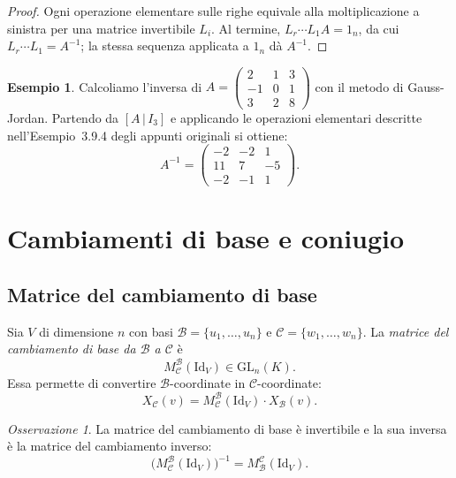 \documentclass[11pt, a4paper]{book}
\theoremstyle{definition}
\newtheorem{esempio}[definizione]{Esempio}
\theoremstyle{plain}
\theoremstyle{remark}
\newtheorem{osservazione}[definizione]{Osservazione}
\newcommand{\Id}{\mathrm{Id}}
\newcommand{\GL}{\mathrm{GL}}
\begin{document}
\begin{proof}
Ogni operazione elementare sulle righe equivale alla moltiplicazione a sinistra per una matrice invertibile $L_i$. Al termine, $L_r \cdots L_1 A = 1_n$, da cui $L_r \cdots L_1 = A^{-1}$; la stessa sequenza applicata a $1_n$ dà $A^{-1}$.
\end{proof}

\begin{exbox}
\begin{esempio}
Calcoliamo l'inversa di $A = \begin{pmatrix} 2 & 1 & 3 \\ -1 & 0 & 1 \\ 3 & 2 & 8 \end{pmatrix}$ con il metodo di Gauss-Jordan. Partendo da $[A\,|\,I_3]$ e applicando le operazioni elementari descritte nell'Esempio~3.9.4 degli appunti originali si ottiene:
\[
  A^{-1} = \begin{pmatrix} -2 & -2 & 1 \\ 11 & 7 & -5 \\ -2 & -1 & 1 \end{pmatrix}.
\]
\end{esempio}
\end{exbox}

\section{Cambiamenti di base e coniugio}
\label{sec:cambiobase}

\subsection{Matrice del cambiamento di base}

Sia $V$ di dimensione $n$ con basi $\mathcal{B} = \{u_1, \ldots, u_n\}$ e $\mathcal{C} = \{w_1, \ldots, w_n\}$. La \emph{matrice del cambiamento di base da $\mathcal{B}$ a $\mathcal{C}$} è
\[
  M^\mathcal{B}_\mathcal{C}(\Id_V) \in \GL_n(K).
\]
Essa permette di convertire $\mathcal{B}$-coordinate in $\mathcal{C}$-coordinate:
\[
  X_\mathcal{C}(v) = M^\mathcal{B}_\mathcal{C}(\Id_V) \cdot X_\mathcal{B}(v).
\]

\begin{osservazione}
La matrice del cambiamento di base è invertibile e la sua inversa è la matrice del cambiamento inverso:
\[
  \bigl(M^\mathcal{B}_\mathcal{C}(\Id_V)\bigr)^{-1} = M^\mathcal{C}_\mathcal{B}(\Id_V).
\]
\end{osservazione}
\end{document}
